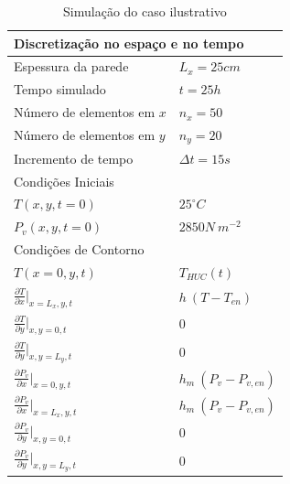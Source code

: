 \begin{table}[]
\centering
\caption{Simulação do caso ilustrativo}
\label{tab:case_ics_bcs}
\begin{tabular}{|ll|}
\hline
\multicolumn{2}{|l|}{Discretização no espaço e no tempo}                                    \\ \hline
Espessura da parede                                          & $L_x = 25 cm$                \\
Tempo simulado                                               & $t = 25 h$                   \\
Número de elementos em $x$                                   & $n_x = 50$                   \\
Número de elementos em $y$                                   & $n_y = 20$                   \\
Incremento de tempo                                          & $\Delta t = 15 s$            \\ \hline
\multicolumn{2}{|l|}{Condições Iniciais}                                                    \\ \hline
$T(x, y, t=0)$                                               & $ 25 ^{\circ}C$              \\
$P_v(x, y, t=0)$                                             & $ 2850 N \ m^{-2} $          \\ \hline
\multicolumn{2}{|l|}{Condições de Contorno}                                                 \\ \hline
$T(x=0, y, t)$                                               & $T_{HUC}(t)$                 \\
$\frac{\partial T}{\partial x}\bigg\rvert_{x = L_x, y, t}$   & $h \ (T - T_{en})$           \\
$\frac{\partial T}{\partial y}\bigg\rvert_{x, y=0, t}$       & $0$                          \\
$\frac{\partial T}{\partial y}\bigg\rvert_{x, y=L_y, t}$     & $0$                          \\
$\frac{\partial P_v}{\partial x}\bigg\rvert_{x = 0, y, t}$   & $h_m \ (P_v - P_{v, en})$    \\
$\frac{\partial P_v}{\partial x}\bigg\rvert_{x = L_x, y, t}$ & $h_m \ (P_v - P_{v, en})$    \\
$\frac{\partial P_v}{\partial y}\bigg\rvert_{x, y=0, t}$     & $0$                          \\
$\frac{\partial P_v}{\partial y}\bigg\rvert_{x, y=L_y, t}$   & $0$                          \\ \hline

\end{tabular}
\end{table}
